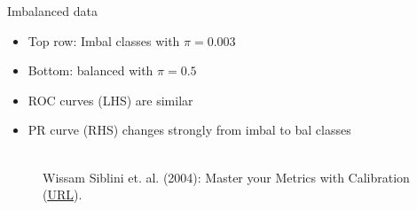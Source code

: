 \begin{vbframe}{Imbalanced data}
\vspace{-0.2cm}
\begin{itemize}
  \item Top row: Imbal classes with $\pi = 0.003$
  \item Bottom: balanced with $\pi = 0.5$
  \item ROC curves (LHS) are similar
  \item PR curve (RHS) changes strongly from imbal to bal classes
\end{itemize}



\begin{figure}
  \centering
  \tiny
  \\ Wissam Siblini et. al. (2004): Master your Metrics with Calibration
  (\href{https://arxiv.org/pdf/1909.02827.pdf}{\underline{URL}}).
\end{figure}


\end{vbframe}
